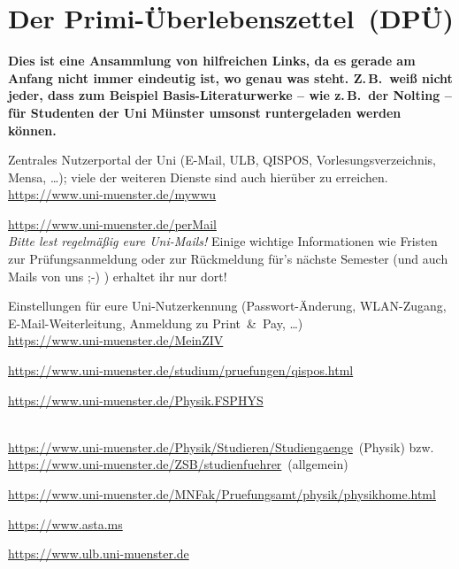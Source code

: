 \section[Primi-Überlebenszettel (DPÜ, wichtige Links)]{Der Primi-Überlebenszettel~(DPÜ)}
\label{dpü}
\vspace{-2ex}
\textbf{Dies ist eine Ansammlung von hilfreichen Links, da es gerade am Anfang nicht immer eindeutig ist, wo genau was steht.
	Z.\,B.\ weiß nicht jeder, dass zum Beispiel Basis-Literaturwerke -- wie z.\,B.\ der Nolting -- für Studenten der Uni Münster umsonst runtergeladen werden können.}
\begin{description}[parsep=1ex, leftmargin=0pt, itemsep=0.2ex]
	\centering
	\item[myWWU-Portal:] Zentrales Nutzerportal der Uni (E-Mail, ULB, QISPOS, Vorlesungsverzeichnis, Mensa, \dots); viele der weiteren Dienste sind auch hierüber zu erreichen.\\
	\url{https://www.uni-muenster.de/mywwu}
	\item[Uni-Mailsystem (perMail):] \url{https://www.uni-muenster.de/perMail}\\
	\emph{Bitte lest regelmäßig eure Uni-Mails!}
	Einige wichtige Informationen wie Fristen zur Prüfungsanmeldung oder zur Rückmeldung für's nächste Semester (und auch Mails von uns ;-) ) erhaltet ihr nur dort!
	\item[MeinZIV:] Einstellungen für eure Uni-Nutzerkennung (Passwort-Änderung, WLAN-Zugang, E-Mail-Weiterleitung, Anmeldung zu Print~\&~Pay, \dots)\\	
	\url{https://www.uni-muenster.de/MeinZIV}
	\item[QISPOS:] \url{https://www.uni-muenster.de/studium/pruefungen/qispos.html}
	\item[Fachschaft Physik:] \url{https://www.uni-muenster.de/Physik.FSPHYS}
	\item[Prüfungsordnungen/Studiengangs-Infos:]~\\
	\url{https://www.uni-muenster.de/Physik/Studieren/Studiengaenge}~(Physik) bzw.\\
	\url{https://www.uni-muenster.de/ZSB/studienfuehrer}~(allgemein)
	\item[Prüfungsamt Physik:] \url{https://www.uni-muenster.de/MNFak/Pruefungsamt/physik/physikhome.html}
	\item[AStA Uni Münster:] \url{https://www.asta.ms}
	\item[Universitäts- und Landesbibliothek (ULB):] \url{https://www.ulb.uni-muenster.de}

\end{description}
